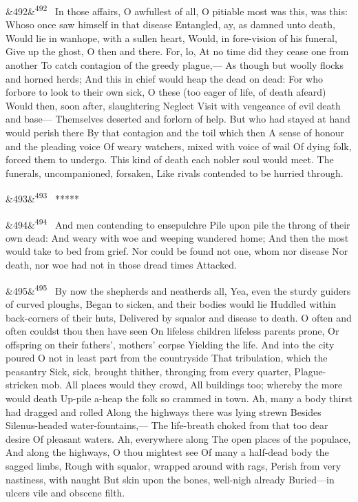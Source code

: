 \documentclass[12pt]{article}
\newcommand{\para}[1][]{\par\noindent\ifx&#1&\else\textsuperscript{\footnotesize #1}~\fi}
\begin{document}
\para[492] In those affairs, O awfullest of all, O pitiable most was this, was this: Whoso once saw himself in that disease Entangled, ay, as damned unto death, Would lie in wanhope, with a sullen heart, Would, in fore-vision of his funeral, Give up the ghost, O then and there. For, lo, At no time did they cease one from another To catch contagion of the greedy plague,--- As though but woolly flocks and horned herds; And this in chief would heap the dead on dead: For who forbore to look to their own sick, O these (too eager of life, of death afeard) Would then, soon after, slaughtering Neglect Visit with vengeance of evil death and base--- Themselves deserted and forlorn of help. But who had stayed at hand would perish there By that contagion and the toil which then A sense of honour and the pleading voice Of weary watchers, mixed with voice of wail Of dying folk, forced them to undergo. This kind of death each nobler soul would meet. The funerals, uncompanioned, forsaken, Like rivals contended to be hurried through.

\para[493] *****

\para[494] And men contending to ensepulchre Pile upon pile the throng of their own dead: And weary with woe and weeping wandered home; And then the most would take to bed from grief. Nor could be found not one, whom nor disease Nor death, nor woe had not in those dread times Attacked.

\para[495] By now the shepherds and neatherds all, Yea, even the sturdy guiders of curved ploughs, Began to sicken, and their bodies would lie Huddled within back-corners of their huts, Delivered by squalor and disease to death. O often and often couldst thou then have seen On lifeless children lifeless parents prone, Or offspring on their fathers', mothers' corpse Yielding the life. And into the city poured O not in least part from the countryside That tribulation, which the peasantry Sick, sick, brought thither, thronging from every quarter, Plague-stricken mob. All places would they crowd, All buildings too; whereby the more would death Up-pile a-heap the folk so crammed in town. Ah, many a body thirst had dragged and rolled Along the highways there was lying strewn Besides Silenus-headed water-fountains,--- The life-breath choked from that too dear desire Of pleasant waters. Ah, everywhere along The open places of the populace, And along the highways, O thou mightest see Of many a half-dead body the sagged limbs, Rough with squalor, wrapped around with rags, Perish from very nastiness, with naught But skin upon the bones, well-nigh already Buried---in ulcers vile and obscene filth.
\end{document}
